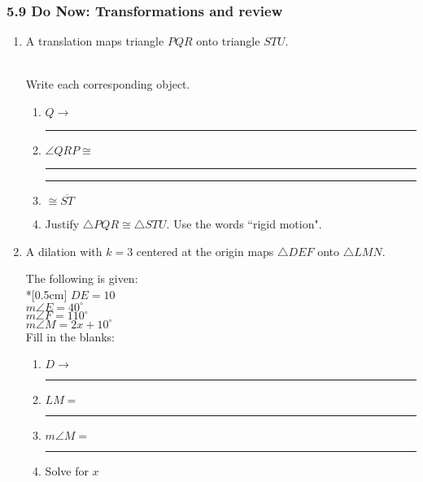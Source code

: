 \documentclass[12pt, twoside]{article}
\begin{document}
\subsubsection*{5.9 Do Now: Transformations and review}
  \begin{enumerate}

  \item A translation maps triangle $PQR$ onto triangle $STU$. \vspace{0.5cm}  
    \begin{multicols}{2}
      \\
      Write each corresponding object.
      \begin{enumerate}
        \item $Q \rightarrow$ \rule{2cm}{0.15mm}
        \item $\angle QRP \cong$ \rule{2cm}{0.15mm}
        \item \rule{2cm}{0.15mm} $\cong \overline {ST}$
        \item Justify $\triangle PQR \cong \triangle STU$. Use the words ``rigid motion".
      \end{enumerate}
    \end{multicols}  \vspace{1cm}

  \item A dilation with $k=3$ centered at the origin maps $\triangle DEF$ onto $\triangle LMN$. \vspace{0.5cm}
    \begin{multicols}{2}
      The following is given:\\*[0.5cm]
      $DE=10$ \\
      $m\angle E = 40^\circ$ \\
      $m\angle F = 110^\circ$ \\
      $m\angle M = 2x + 10^\circ$ \\
      Fill in the blanks:
      \begin{enumerate}
        \item $D \rightarrow$ \rule{2cm}{0.15mm}
        \item $LM =$ \rule{2cm}{0.15mm}
        \item $m\angle M =$ \rule{2cm}{0.15mm}
        \item Solve for $x$
      \end{enumerate}
    \end{multicols}  \vspace{2cm}
  

\end{enumerate}
\end{document}

